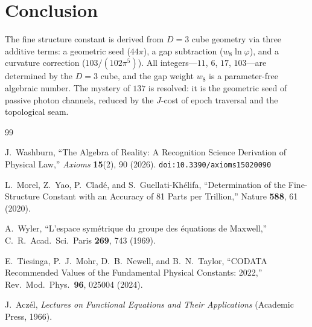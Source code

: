 \documentclass[12pt,a4paper]{article}
\theoremstyle{definition}
\theoremstyle{remark}
\begin{document}
\section{Conclusion}
\label{sec:conclusion}

The fine structure constant is derived from $D = 3$ cube geometry
via three additive terms: a geometric seed ($44\pi$), a gap
subtraction ($w_8\ln\varphi$), and a curvature correction
($103/(102\pi^5)$).  All integers---$11$, $6$, $17$, $103$---are
determined by the $D = 3$ cube, and the gap weight $w_8$ is a
parameter-free algebraic number.  The mystery of $137$ is
resolved: it is the geometric seed of passive photon channels,
reduced by the $J$-cost of epoch traversal and the topological
seam.

\begin{thebibliography}{99}

J.~Washburn, ``The Algebra of Reality: A Recognition Science Derivation
of Physical Law,'' \emph{Axioms} \textbf{15}(2), 90 (2026).
\texttt{doi:10.3390/axioms15020090}

L.~Morel, Z.~Yao, P.~Clad\'e, and S.~Guellati-Kh\'elifa,
``Determination of the Fine-Structure Constant with an Accuracy
of 81 Parts per Trillion,'' Nature \textbf{588}, 61 (2020).

A.~Wyler, ``L'espace sym\'etrique du groupe des \'equations de
Maxwell,'' C.~R.~Acad.~Sci.~Paris \textbf{269}, 743 (1969).

E.~Tiesinga, P.~J.~Mohr, D.~B.~Newell, and B.~N.~Taylor,
``CODATA Recommended Values of the Fundamental Physical
Constants: 2022,'' Rev.\ Mod.\ Phys.\ \textbf{96}, 025004
(2024).

J.~Acz\'el, \emph{Lectures on Functional Equations and Their
Applications} (Academic Press, 1966).

\end{thebibliography}
\end{document}
